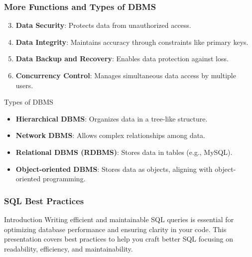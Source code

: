 \documentclass[aspectratio=169]{beamer}
\begin{document}
\begin{frame}[fragile]
    \frametitle{More Functions and Types of DBMS}
    \begin{enumerate}
        \setcounter{enumi}{2}
        \item \textbf{Data Security}: Protects data from unauthorized access.
        \item \textbf{Data Integrity}: Maintains accuracy through constraints like primary keys.
        \item \textbf{Data Backup and Recovery}: Enables data protection against loss.
        \item \textbf{Concurrency Control}: Manages simultaneous data access by multiple users.
    \end{enumerate}

    \begin{block}{Types of DBMS}
        \begin{itemize}
            \item \textbf{Hierarchical DBMS}: Organizes data in a tree-like structure.
            \item \textbf{Network DBMS}: Allows complex relationships among data.
            \item \textbf{Relational DBMS (RDBMS)}: Stores data in tables (e.g., MySQL).
            \item \textbf{Object-oriented DBMS}: Stores data as objects, aligning with object-oriented programming.
        \end{itemize}
    \end{block}
\end{frame}

\begin{frame}
    \frametitle{SQL Best Practices}
    \begin{block}{Introduction}
        Writing efficient and maintainable SQL queries is essential for optimizing database performance and ensuring clarity in your code. This presentation covers best practices to help you craft better SQL focusing on readability, efficiency, and maintainability.
    \end{block}
\end{frame}
\end{document}
